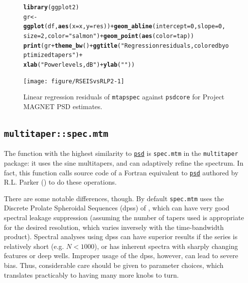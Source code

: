 \documentclass[10pt]{article}\usepackage[]{graphicx}\usepackage[]{color}
\makeatletter
\newcommand{\hlnum}[1]{\textcolor[rgb]{0.686,0.059,0.569}{#1}}%
\newcommand{\hlstr}[1]{\textcolor[rgb]{0.192,0.494,0.8}{#1}}%
\newcommand{\hlopt}[1]{\textcolor[rgb]{0,0,0}{#1}}%
\newcommand{\hlstd}[1]{\textcolor[rgb]{0.345,0.345,0.345}{#1}}%
\newcommand{\hlkwb}[1]{\textcolor[rgb]{0.69,0.353,0.396}{#1}}%
\newcommand{\hlkwc}[1]{\textcolor[rgb]{0.333,0.667,0.333}{#1}}%
\newcommand{\hlkwd}[1]{\textcolor[rgb]{0.737,0.353,0.396}{\textbf{#1}}}%
\newenvironment{kframe}{%
 \def\at@end@of@kframe{}%
 \ifinner\ifhmode%
  \def\at@end@of@kframe{\end{minipage}}%
  \begin{minipage}{\columnwidth}%
 \fi\fi%
 \def\FrameCommand##1{\hskip\@totalleftmargin \hskip-\fboxsep
 \colorbox{shadecolor}{##1}\hskip-\fboxsep
     \hskip-\linewidth \hskip-\@totalleftmargin \hskip\columnwidth}%
 \MakeFramed {\advance\hsize-\width
   \@totalleftmargin\z@ \linewidth\hsize
   \@setminipage}}%
 {\par\unskip\endMakeFramed%
 \at@end@of@kframe}
\newenvironment{knitrout}{}{} %
\newcommand{\Rcmd}[1]{\texttt{#1}}
\newcommand{\psd}[0]{\href{http://www.github.com/abarbour/psd/}{\color{blue}\Rcmd{psd}}}
\makeatother
\begin{document}
\begin{figure}[h!]
\begin{center}
\begin{knitrout}\small
{}\color{fgcolor}\begin{kframe}
\begin{alltt}
\hlkwd{library}\hlstd{(ggplot2)}
\hlstd{gr} \hlkwb{<-} \hlkwd{ggplot}\hlstd{(df,} \hlkwd{aes}\hlstd{(}\hlkwc{x} \hlstd{= x,} \hlkwc{y} \hlstd{= res))} \hlopt{+} \hlkwd{geom_abline}\hlstd{(}\hlkwc{intercept} \hlstd{=} \hlnum{0}\hlstd{,} \hlkwc{slope} \hlstd{=} \hlnum{0}\hlstd{,}
    \hlkwc{size} \hlstd{=} \hlnum{2}\hlstd{,} \hlkwc{color} \hlstd{=} \hlstr{"salmon"}\hlstd{)} \hlopt{+} \hlkwd{geom_point}\hlstd{(}\hlkwd{aes}\hlstd{(}\hlkwc{color} \hlstd{= tap))}
\hlkwd{print}\hlstd{(gr} \hlopt{+} \hlkwd{theme_bw}\hlstd{()} \hlopt{+} \hlkwd{ggtitle}\hlstd{(}\hlstr{"Regression residuals, colored by optimized tapers"}\hlstd{)} \hlopt{+}
    \hlkwd{xlab}\hlstd{(}\hlstr{"Power levels, dB"}\hlstd{)} \hlopt{+} \hlkwd{ylab}\hlstd{(}\hlstr{""}\hlstd{))}
\end{alltt}
\end{kframe}
\texttt{[image: figure/RSEISvsRLP2-1]} 

\end{knitrout}
\caption{Linear regression residuals of
\Rcmd{mtapspec} against \Rcmd{psdcore} for Project MAGNET PSD estimates.}
\label{fig:psdreg}
\end{center}
\end{figure}

\subsection{\Rcmd{multitaper::spec.mtm}}
The function with the highest similarity to \psd{} is
\Rcmd{spec.mtm} in the \Rcmd{multitaper} package: it uses
the sine multitapers, and can adaptively refine the spectrum.
In fact, this function
calls source code of a Fortran equivalent to \psd{}
authored by R.L. Parker (\citeyear{parkerweb}) to do these operations.

There are some notable differences, though.  
By default \Rcmd{spec.mtm}
 uses the Discrete Prolate Spheroidal Sequences (dpss) 
of \citet{thomson1982},
which can have very good spectral leakage suppression (assuming
the number of tapers used is appropriate for the 
desired resolution, which varies inversely with the time-bandwidth product).
Spectral analyses using dpss can have superior results if the series is
relatively short (e.g. $N < 1000$), or has inherent spectra
with sharply changing features or
deep wells.
Improper usage of the dpss, however, can lead to severe bias.
Thus, considerable care should be given to parameter choices, 
which translates practicably
to having many more knobs to turn.
\end{document}
